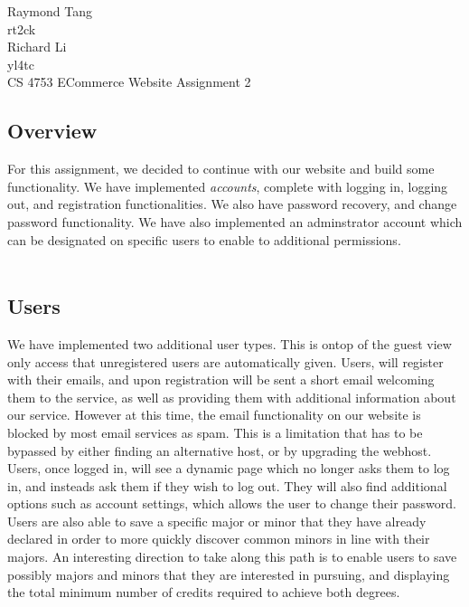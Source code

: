 \documentclass{article}
\begin{document}
\begin{singlespace}
\noindent Raymond Tang\\
rt2ck\\
Richard Li\\
yl4tc\\
CS 4753 ECommerce Website Assignment 2\\
\end{singlespace}

\begin{doublespace}
\subsection*{Overview}
\indent For this assignment, we decided to continue with our website and build some functionality. We have implemented \emph{accounts}, complete with logging in, logging out, and registration functionalities. We also have password recovery, and change password functionality. We have also implemented an adminstrator account which can be designated on specific users to enable to additional permissions.\\
\\
\subsection*{Users}
\indent We have implemented two additional user types. This is ontop of the guest view only access that unregistered users are automatically given. Users, will register with their emails, and upon registration will be sent a short email welcoming them to the service, as well as providing them with additional information about our service. However at this time, the email functionality on our website is blocked by most email services as spam. This is a limitation that has to be bypassed by either finding an alternative host, or by upgrading the webhost.\\
\indent Users, once logged in, will see a dynamic page which no longer asks them to log in, and insteads ask them if they wish to log out. They will also find additional options such as account settings, which allows the user to change their password.\\
\indent Users are also able to save a specific major or minor that they have already declared in order to more quickly discover common minors in line with their majors. An interesting direction to take along this path is to enable users to save possibly majors and minors that they are interested in pursuing, and displaying the total minimum number of credits required to achieve both degrees.\\
\\

\end{doublespace}
\end{document}
